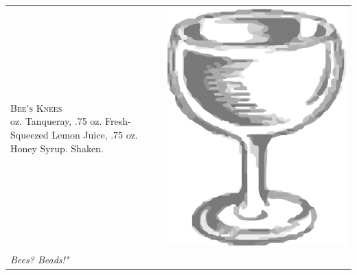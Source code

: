 \documentclass{article}
\begin{document}
\begin{tabular}{*{2}{m{}}}
{\raggedleft\huge\textsc{Bee's Knees}\\*}
\raggedleft 2 oz. Tanqueray, .75 oz. Fresh-Squeezed Lemon Juice, .75 oz. Honey Syrup. Shaken. & \includegraphics{coupe.png}\\
\raggedleft\small\textit{Bees? Beads!"}
\end{tabular}
\end{document}
